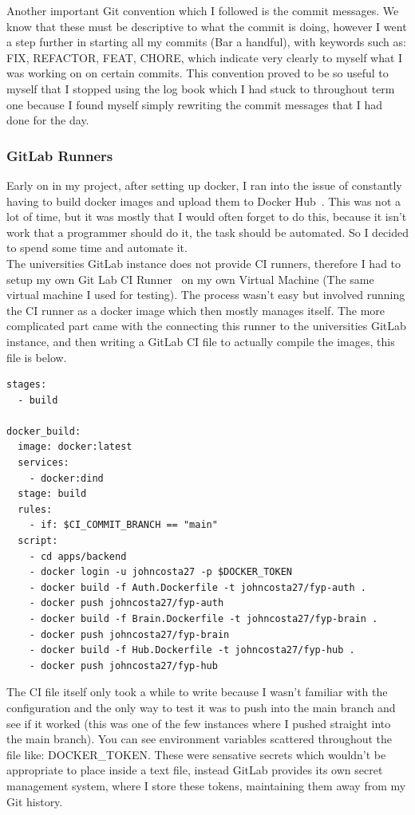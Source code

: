 \documentclass[titlepage]{article}
\begin{document}
Another important Git convention which I followed is the commit messages. We know that these must be descriptive to what the commit is doing, however I went a step further in starting all my commits (Bar a handful), with keywords such as: FIX, REFACTOR, FEAT, CHORE, which indicate very clearly to myself what I was working on on certain commits. This convention proved to be so useful to myself that I stopped using the log book which I had stuck to throughout term one because I found myself simply rewriting the commit messages that I had done for the day. 

\pagebreak
\subsubsection{GitLab Runners}
Early on in my project, after setting up docker, I ran into the issue of constantly having to build docker images and upload them to Docker Hub~\cite{docker_hub}. This was not a lot of time, but it was mostly that I would often forget to do this, because it isn't work that a programmer should do it, the task should be automated. So I decided to spend some time and automate it. \\

The universities GitLab instance does not provide CI runners, therefore I had to setup my own Git Lab CI Runner~\cite{gitlab_runner} on my own Virtual Machine (The same virtual machine I used for testing). The process wasn't easy but involved running the CI runner as a docker image which then mostly manages itself. The more complicated part came with the connecting this runner to the universities GitLab instance, and then writing a GitLab CI file to actually compile the images, this file is below.

\begin{verbatim}
stages:
  - build

docker_build:
  image: docker:latest
  services:
    - docker:dind
  stage: build
  rules:
    - if: $CI_COMMIT_BRANCH == "main"
  script:
    - cd apps/backend
    - docker login -u johncosta27 -p $DOCKER_TOKEN
    - docker build -f Auth.Dockerfile -t johncosta27/fyp-auth .
    - docker push johncosta27/fyp-auth
    - docker build -f Brain.Dockerfile -t johncosta27/fyp-brain .
    - docker push johncosta27/fyp-brain
    - docker build -f Hub.Dockerfile -t johncosta27/fyp-hub .
    - docker push johncosta27/fyp-hub
\end{verbatim}

The CI file itself only took a while to write because I wasn't familiar with the configuration and the only way to test it was to push into the main branch and see if it worked (this was one of the few instances where I pushed straight into the main branch). You can see environment variables scattered throughout the file like: DOCKER\_TOKEN. These were sensative secrets which wouldn't be appropriate to place inside a text file, instead GitLab provides its own secret management system, where I store these tokens, maintaining them away from my Git history. \\
\end{document}
